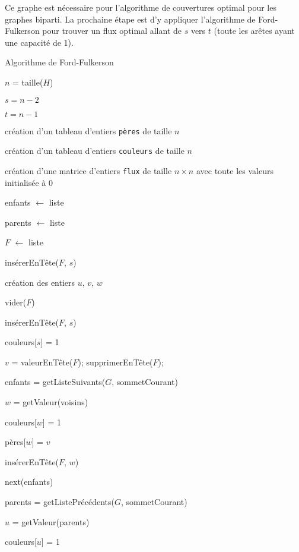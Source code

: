\documentclass[a4paper,10pt]{article}
\begin{document}
Ce graphe est nécessaire pour l'algorithme de couvertures optimal pour les graphes biparti. La prochaine étape est d'y appliquer l'algorithme de Ford-Fulkerson pour trouver un flux optimal allant de $s$ vers $t$ (toute les arêtes ayant une capacité de 1).
\\
\begin{algorithm}[H]
\caption{Algorithme de Ford-Fulkerson}
\BlankLine
$n$ = taille($H$)

$s = n-2$

$t = n-1$

création d'un tableau d'entiers \texttt{pères} de taille $n$

création d'un tableau d'entiers \texttt{couleurs} de taille $n$

création d'une matrice d'entiers \texttt{flux} de taille $n\times n$ avec toute les valeurs initialisée à 0

enfants $\leftarrow$ liste

parents $\leftarrow$ liste

$F$ $\leftarrow$ liste

insérerEnTête($F$, $s$)

création des entiers $u$, $v$, $w$

{
	vider($F$)
	
	insérerEnTête($F$, $s$)
	
	couleurs[$s$] = 1
	
	{
		$v$ = valeurEnTête($F$);
		supprimerEnTête($F$);
	
		enfants = getListeSuivants($G$, sommetCourant)
		
		{
			$w$ = getValeur(voisins)
			
			{
				couleurs[$w$] = 1
				
				pères[$w$] = $v$
				
				insérerEnTête($F$, $w$)
			}
			next(enfants)
		}

		parents = getListePrécédents($G$, sommetCourant)
		
		{
			$u$ = getValeur(parents)
			
			{
				couleurs[$u$] = 1
				
}}}}
\end{algorithm}
\end{document}
